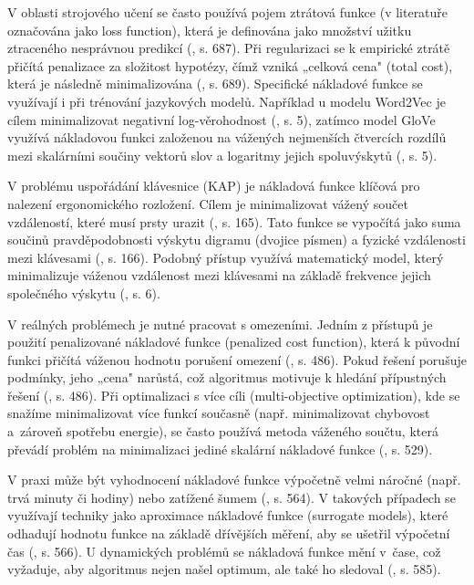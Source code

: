 \documentclass[a4paper, twoside, 12pt, czech]{article}
\begin{document}
V oblasti strojového učení se často používá pojem ztrátová funkce (v literatuře označována jako loss function), 
která je definována jako množství užitku ztraceného nesprávnou predikcí (\cite{aiModernApproach}, s. 687). Při 
regularizaci se k empirické ztrátě přičítá penalizace za složitost hypotézy, 
čímž vzniká „celková cena" \space (total cost), která je následně minimalizována (\cite{aiModernApproach}, s. 689). 
Specifické nákladové funkce se využívají i při trénování jazykových modelů. 
Například u modelu Word2Vec je cílem minimalizovat negativní log-věrohodnost (\cite{evolutionFromNgrams}, s. 5), 
zatímco model GloVe využívá nákladovou funkci založenou na vážených nejmenších 
čtvercích rozdílů mezi skalárními součiny vektorů slov a logaritmy jejich 
spoluvýskytů (\cite{evolutionFromNgrams}, s. 5).

V problému uspořádání klávesnice (KAP) je nákladová funkce klíčová pro nalezení 
ergonomického rozložení. Cílem je minimalizovat vážený součet vzdále\-ností, které 
musí prsty urazit (\cite{7814594}, s. 165). Tato funkce se vypočítá jako suma součinů pravděpodobnosti 
výskytu digramu (dvojice písmen) a fyzické vzdálenos\-ti mezi klávesami (\cite{7814594}, s. 166). Podobný 
přístup využívá matematický model, který minimalizuje váženou vzdálenost mezi 
klávesami na základě frekvence jejich společného výskytu (\cite{applicationAlgo}, s. 6).

V reálných problémech je nutné pracovat s omezeními. Jedním z přístupů je 
použití penalizované nákladové funkce (penalized cost function), která k 
původní funkci přičítá váženou hodnotu porušení omezení (\cite{evolutionaryOptimizationAlgos}, s. 486). Pokud řešení poru\-šuje 
podmínky, jeho „cena" \space narůstá, což algoritmus motivuje k hledání přípustných 
řešení (\cite{evolutionaryOptimizationAlgos}, s. 486). Při optimalizaci s více cíli (multi-objective optimization), kde se 
snažíme minimalizovat více funkcí současně (např. minimalizovat chybovost a~zároveň
 spotřebu energie), se často používá metoda váženého součtu, která 
převádí problém na minimalizaci jediné skalární nákladové funkce (\cite{evolutionaryOptimizationAlgos}, s. 529).

V praxi může být vyhodnocení nákladové funkce výpočetně velmi náročné (např. 
trvá minuty či hodiny) nebo zatížené šumem (\cite{evolutionaryOptimizationAlgos}, s. 564). V takových případech se využívají 
techniky jako aproximace nákladové funkce (surrogate models), které odhadují 
hodnotu funkce na základě dřívějších měření, aby se ušetřil výpočetní čas (\cite{evolutionaryOptimizationAlgos}, s. 566). U 
dynamických problémů se nákladová funkce mění v~čase, což vyžaduje, aby 
algoritmus nejen našel optimum, ale také ho sledoval (\cite{evolutionaryOptimizationAlgos}, s. 585).
\end{document}
